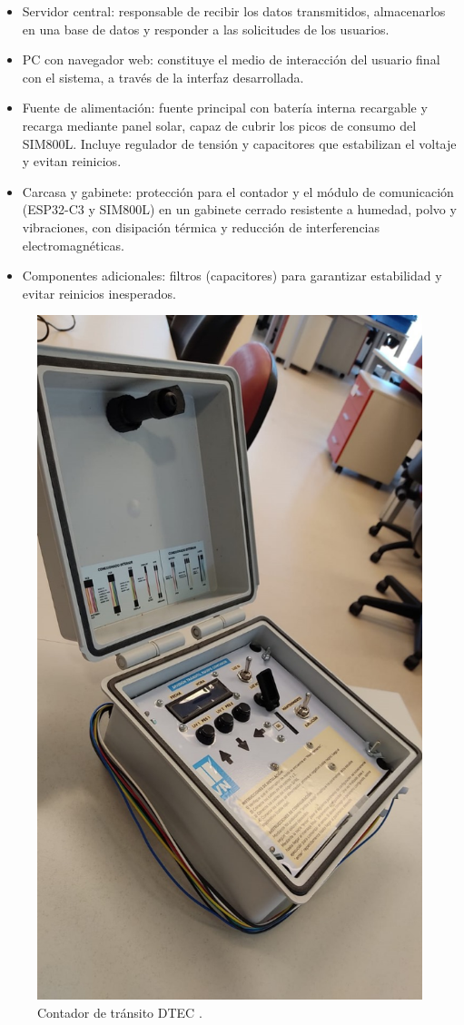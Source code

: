 \begin{itemize}
\item Servidor central: responsable de recibir los datos transmitidos, almacenarlos en una base de datos y responder a las solicitudes de los usuarios.

\item PC con navegador web: constituye el medio de interacción del usuario final con el sistema, a través de la interfaz desarrollada.

\item Fuente de alimentación: fuente principal con batería interna recargable y recarga mediante panel solar, capaz de cubrir los picos de consumo del SIM800L. Incluye regulador de tensión y capacitores que estabilizan el voltaje y evitan reinicios.

\item Carcasa y gabinete: protección para el contador y el módulo de comunicación (ESP32-C3 y SIM800L) en un gabinete cerrado resistente a humedad, polvo y vibraciones, con disipación térmica y reducción de interferencias electromagnéticas.

\item Componentes adicionales: filtros (capacitores) para garantizar estabilidad y evitar reinicios inesperados.


\end{itemize}



\begin{figure}[htbp]
  \centering
  \includegraphics[width=0.4\linewidth]{./Figures/fotoDTEC.jpeg}
  \caption{Contador de tránsito DTEC \protect\footnotemark.}
  \label{fig:foto_dtec}
\end{figure}


